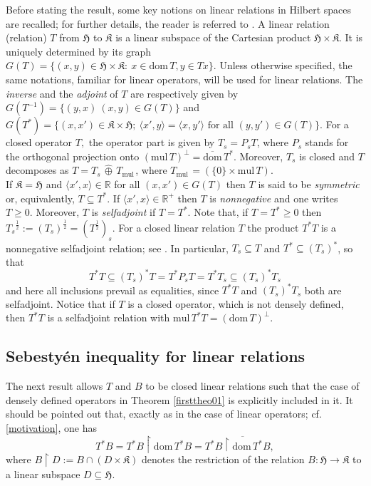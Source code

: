 \documentclass{amsart}
\newcommand{\h}{\mathfrak{H}}
\newcommand{\kk}{\mathfrak{K}}
\newcommand{\mul}{\mathrm{mul} \, }
\newcommand{\dombar}{\overline{\mathrm{dom}}\,}%
\newcommand{\D}{\mathrm{dom}\,}
\newcommand{\DT}{\mathrm{dom}\,T }
\newcommand{\adj}{^*}
\newcommand{\inv}{^{-1}}
\newcommand{\ts}{T_s}
\newcommand{\tstar}{T^{*}}
\newcommand{\half}{^{\frac{1}{2}}}
\newcommand{\R}{\mathbb{R}}
\newcommand{\rplus}{\mathbb{R^+}}
\newcommand{\inclu}{\subseteq}
\newcommand{\rest}{\upharpoonright}
\numberwithin{equation}{section}
\begin{document}
Before stating the result, some key notions on  linear relations in Hilbert spaces are recalled; for further details, the reader is referred to \cite{cross, behrndt2020boundary, arens}.   A linear relation (relation) $T$ from $\h$  to  $\kk$ is a linear subspace of the Cartesian product $\h \times \kk$. It is uniquely determined by its graph $G(T)=\{ (x,y) \in \h \times \kk : \ x \in \D T , y \in Tx \}.$
Unless otherwise specified, the same notations, familiar for linear operators, will be used for linear relations.  The \emph{inverse} and the \emph{adjoint} of $T$ are respectively given by  $G(T\inv)=\{ (y,x) \ (x,y) \in G(T)\}$ and  $G(T\adj)=\{ (x,x') \in \kk \times \h ; \ \langle x',y \rangle = \langle x, y' \rangle \text{ for all } (y,y') \in G(T)\}$.
For a closed operator $T,$ the  operator part   is given by $T_s=P_{s}T$,
where $P_s$ stands for the orthogonal projection onto $(\mul T)^\perp=\dombar T^*$. Moreover,
  $T_s$ is   closed and $T$ decomposes as $T=T_s \,\widehat\oplus\, T_{\mul}$,
where $T_{\mul}=(\{0\} \times \mul T)$.\\
\hspace*{0.4cm}
%
If $\kk=\h$ and $\langle x',x \rangle \in \R $ for all $(x,x')\in G(T)$ then $T$ is said to be \emph{symmetric} or, equivalently, $T \inclu \tstar.$
 If  $ \langle x',x \rangle \in \rplus$ then $T$ is \emph{nonnegative} and one writes $T \geq 0.$   Moreover,  $T$ is \emph{selfadjoint} if $T = \tstar.$
 Note that, if $T=\tstar \geq 0$ then $ {\ts}\half := (T_s)\half= (T\half)_s$. For a closed linear relation $T$ the product $\tstar T$ is a nonnegative selfadjoint relation; see \cite[Lemma~1.5.8]{behrndt2020boundary}.
In particular, $T_s\subseteq T$ and $T^* \subseteq (T_s)^*$, so that
\begin{equation}\label{T*Teq}
  T^*T \subseteq (T_s)^*T = T^*P_s T = T^*T_s \subseteq (T_s)^*T_s
\end{equation}
and here all inclusions prevail as equalities, since $T^*T$ and $(T_s)^*T_s$ both are selfadjoint. Notice that if $T$ is a closed operator, which is not densely defined, then $T^*T$ is a selfadjoint relation with $\mul T^*T=(\DT)^\perp.$


\subsection{Sebestyén inequality for linear relations } \label{relsub1}

 The next result allows $T$ and $B$ to be closed linear relations such that the case of densely defined operators in  Theorem \ref{firsttheo01} is explicitly included in it. It should be pointed out that,    exactly as in the case of linear operators; cf. \eqref{motivation}, one has
\begin{equation}\label{mdina}
  \tstar B = \tstar B \rest \D \tstar B = \tstar \overline{B \rest \D \tstar B},
\end{equation}
where $B \rest D := B \cap ( D \times \kk)$ denotes the restriction of the relation $B: \h \rightarrow \kk$ to a linear subspace $D \inclu \h.$
\end{document}
